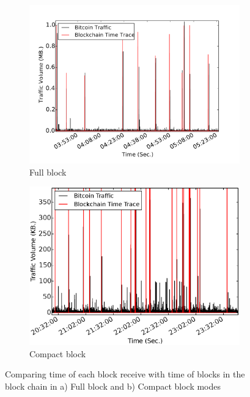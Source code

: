  \begin{figure}[!t]
\begin{subfigure}{.48\linewidth}
\centering
\includegraphics[width=\linewidth]{image/bitcoin_traffic_pattern.pdf}
\caption{Full block}
\label{fig:bitcoin_traffic_pattern}
\end{subfigure}
\centering
\begin{subfigure}{.48\linewidth}
\includegraphics[width=\linewidth]{image/cmpctblock_traffic_volume_good.eps}
\caption{Compact block}
\label{fig:cmpctblock_traffic_volume_detectable}
\end{subfigure}
\caption{Comparing time of each block receive with time of blocks in the block chain in a) Full block and b) Compact block modes}
\end{figure}

